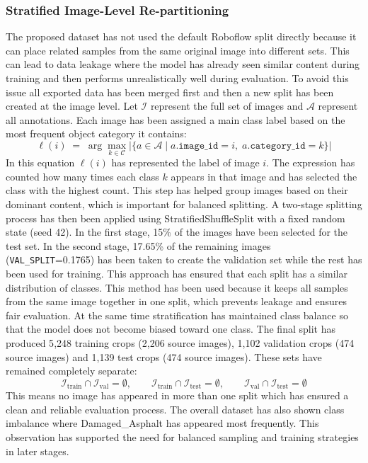 \documentclass{article}
\begin{document}
\subsubsection*{Stratified Image-Level Re-partitioning}
\label{sec:stratified_split}
The proposed dataset \cite{moni2026wastesegcluster} has not used the default Roboflow split directly because it can place related samples from the same original image into different sets. This can lead to data leakage where the model has already seen similar content during training and then performs unrealistically well during evaluation. To avoid this issue all exported data has been merged first and then a new split has been created at the image level.
Let $\mathcal{I}$ represent the full set of images and $\mathcal{A}$ represent all annotations. Each image has been assigned a main class label based on the most frequent object category it contains:
\[
  \ell(i) \;=\;
  \arg\max_{k \in \mathcal{C}}
  \bigl|\{a \in \mathcal{A} \mid
  a.\texttt{image\_id}=i,\;
  a.\texttt{category\_id}=k\}\bigr|
\]
In this equation $\ell(i)$ has represented the label of image $i$. The expression has counted how many times each class $k$ appears in that image and has selected the class with the highest count. This step has helped group images based on their dominant content, which is important for balanced splitting. A two-stage splitting process has then been applied using StratifiedShuffleSplit with a fixed random state (seed 42). In the first stage, 15\% of the images have been selected for the test set. In the second stage, 17.65\% of the remaining images (\texttt{VAL\_SPLIT}=0.1765) has been taken to create the validation set while the rest has been used for training. This approach has ensured that each split has a similar distribution of classes. This method has been used because it keeps all samples from the same image together in one split, which prevents leakage and ensures fair evaluation. At the same time stratification has maintained class balance so that the model does not become biased toward one class. The final split has produced 5{,}248 training crops (2{,}206 source images), 1{,}102 validation crops (474 source images) and 1{,}139 test crops (474 source images). These sets have remained completely separate:
\[
  \mathcal{I}_{\text{train}} \cap \mathcal{I}_{\text{val}}   = \emptyset,
  \qquad
  \mathcal{I}_{\text{train}} \cap \mathcal{I}_{\text{test}}  = \emptyset,
  \qquad
  \mathcal{I}_{\text{val}}   \cap \mathcal{I}_{\text{test}}  = \emptyset
\]
This means no image has appeared in more than one split which has ensured a clean and reliable evaluation process. The overall dataset has also shown class imbalance where Damaged\_Asphalt has appeared most frequently. This observation has supported the need for balanced sampling and training strategies in later stages.
\end{document}
